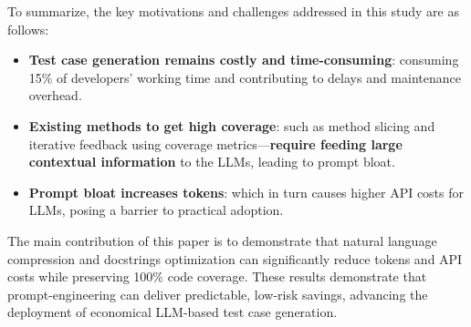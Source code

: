 To summarize, the key motivations and challenges addressed in this study are as follows:

\begin{itemize}[label={$\bullet$}]
    \item \textbf{Test case generation remains costly and time-consuming}: consuming 15\% of developers’ working time and contributing to delays and maintenance overhead.
    \vspace{0.2cm}
    
    \item \textbf{Existing methods to get high coverage}: such as method slicing and iterative feedback using coverage metrics—\textbf{require feeding large contextual information} to the LLMs, leading to prompt bloat.
    \vspace{0.2cm}
    
    \item \textbf{Prompt bloat increases tokens}: which in turn causes higher API costs for LLMs, posing a barrier to practical adoption.
\end{itemize}

The main contribution of this paper is to demonstrate that natural language compression and docstrings optimization can significantly reduce tokens and API costs while preserving 100\% code coverage. These results demonstrate that prompt-engineering can deliver predictable, low-risk savings, advancing the deployment of economical LLM-based test case generation.
